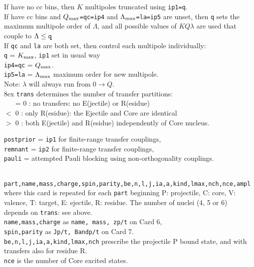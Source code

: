 \documentclass[11pt]{article}
\begin{document}
If have no cc bins, then $K$ multipoles truncated using {\tt ip1=q}.\\
If have cc bins and $Q_{\rm max}${\tt =qc=ip4} and
$\Lambda_{\rm max}${\tt =la=ip5} are unset, then
{\tt q} sets the maximum multipole order of $\Lambda$, and
 all possible values of  $KQ\lambda$ are used that couple to $\Lambda \le {\tt q}$\\
If {\tt qc} and {\tt la} are both set, then control each multipole
individually:\\
\hspace*{1cm} {\tt q}     = $K_{\rm max}$,  {\tt ip1} set in usual way\\
\hspace*{1cm} {\tt ip4=qc}  = $Q_{\rm max}$. \\
\hspace*{1cm} {\tt ip5=la} = $\Lambda_{\rm max}$ maximum order for new
multipole.\\
\hspace*{1cm}  Note: $\lambda$ will always run from $0\rightarrow Q$.\\


\hangindent 8ex
{\tt trans} determines the number of transfer partitions:\\
~ ~   = 0 : no transfers: no E(jectile) or R(esidue)
\\    $<$ 0 : only R(esidue): the Ejectile and Core are identical
\\    $>$ 0 : both E(jectile) and R(esidue) independently of Core nucleus.

{\tt postprior} = {\tt ip1} for finite-range transfer couplings,\\
{\tt remnant} = {\tt ip2} for finite-range transfer couplings,\\
{\tt pauli} = attempted Pauli blocking using non-orthogonality couplings.


\\
{\tt part,name,mass,charge,spin,parity,be,n,l,j,ia,a,kind,lmax,nch,nce,ampl
}\\
where this card is repeated for each {\tt part} beginning P: projectile, C:
core, V: valence, T: target, E: ejectile, R: residue. The number of nuclei
(4, 5 or 6) depends on {\tt trans}: see above.\\
{\tt name,mass,charge} as {\tt name, mass, zp/t} on Card 6,\\
{\tt spin,parity} as {\tt Jp/t, Bandp/t} on Card 7.\\
{\tt be,n,l,j,ia,a,kind,lmax,nch} prescribe the projectile P bound state,
and with transfers also for residue R.\\
{\tt nce} is the number of Core excited states.
\end{document}
